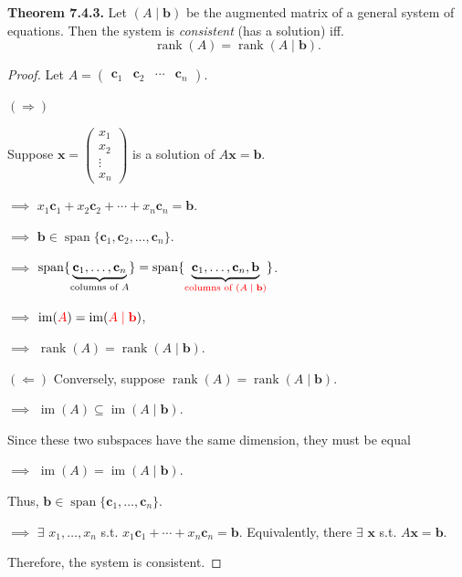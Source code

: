 \documentclass[12pt]{article}
\begin{document}
\textbf{Theorem 7.4.3.}
Let $(A\mid\mathbf{b})$ be the augmented matrix of a general system of
equations. Then the system is \emph{consistent} (has a solution) iff.
\[
\operatorname{rank}(A)=\operatorname{rank}(A\mid\mathbf{b}).
\]

\begin{proof}
Let $A=
\begin{pmatrix}
\mathbf{c}_1 & \mathbf{c}_2 & \cdots & \mathbf{c}_n
\end{pmatrix}$.

$(\Rightarrow)$

Suppose $\mathbf{x}=
\begin{pmatrix}
x_1\\
x_2\\
\vdots\\
x_n
\end{pmatrix}$
is a solution of $A\mathbf{x}=\mathbf{b}$.

$\implies$ $x_1\mathbf{c}_1+x_2\mathbf{c}_2+\cdots+x_n\mathbf{c}_n=\mathbf{b}$.

$\implies$ $\mathbf{b}\in \operatorname{span} \{\mathbf{c}_1,\mathbf{c}_2,\ldots,\mathbf{c}_n\}$.

$\implies$ $\operatorname{span}\{\underbrace{\mathbf{c}_1,\ldots,\mathbf{c}_n}_{\text{columns of $A$}}\}=\operatorname{span}\{\underbrace{\mathbf{c}_1,\ldots,\mathbf{c}_n,\mathbf{b}}_{\textcolor{red}{\text{columns of ($A\mid\mathbf{b}$)}}}\}$.

$\implies$ $\operatorname{im}(\textcolor{red}{A})=\operatorname{im}(\textcolor{red}{A\mid\mathbf{b}})$,

$\implies$ $\operatorname{rank}(A)=\operatorname{rank}(A\mid\mathbf{b})$.

\medskip

$(\Leftarrow)$
Conversely, suppose $\operatorname{rank}(A)=\operatorname{rank}(A\mid\mathbf{b})$.

$\implies$ $\operatorname{im}(A)\subseteq\operatorname{im}(A\mid\mathbf{b})$.

Since these two subspaces have the same dimension, they must be equal

$\implies$ $\operatorname{im}(A)=\operatorname{im}(A\mid\mathbf{b})$.

Thus, $\mathbf{b}\in\operatorname{span}\{\mathbf{c}_1,\ldots,\mathbf{c}_n\}$.

$\implies$ $\exists$ $x_1,\ldots,x_n$ s.t. $x_1\mathbf{c}_1+\cdots+x_n\mathbf{c}_n=\mathbf{b}$.
Equivalently, there $\exists$ $\mathbf{x}$ s.t. $A\mathbf{x}=\mathbf{b}$.

Therefore, the system is consistent.

\end{proof}
\end{document}
